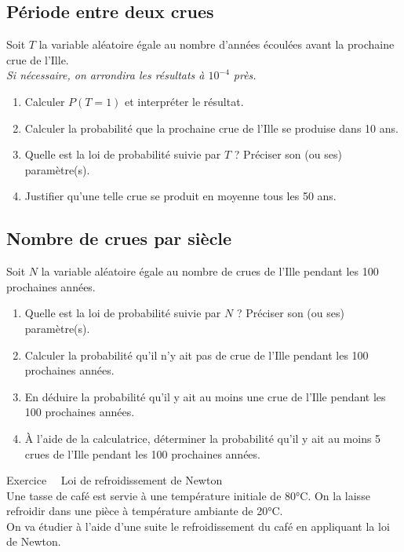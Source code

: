 \documentclass[a4paper,11pt,eval]{nsi}
\newcounter{exoNum}
\newcommand{\exo}[1]
{
	\addtocounter{exoNum}{1}
	{\titlefont\color{UGLiBlue}\Large Exercice\ \theexoNum\ \normalsize{#1}}\smallskip	
}
\begin{document}
\subsection*{Période entre deux crues}
Soit $T$ la variable aléatoire égale au nombre d'années écoulées avant la prochaine crue de l'Ille.\\ 
\textit{Si nécessaire, on arrondira les résultats à $10^{-4}$ près.}
\begin{enumerate}
    \item Calculer $P(T=1)$ et interpréter le résultat.
    \item Calculer la probabilité que la prochaine crue de l'Ille se produise dans 10 ans.
    \item Quelle est la loi de probabilité suivie par $T$ ? Préciser son (ou ses) paramètre(s).
    \item Justifier qu'une telle crue se produit en moyenne tous les 50 ans.
\end{enumerate}

\subsection*{Nombre de crues par siècle}
Soit $N$ la variable aléatoire égale au nombre de crues de l'Ille pendant les 100 prochaines années.
\begin{enumerate}
    \item Quelle est la loi de probabilité suivie par $N$ ? Préciser son (ou ses) paramètre(s).
    \item Calculer la probabilité qu'il n'y ait pas de crue de l'Ille pendant les 100 prochaines années.
    \item En déduire la probabilité qu'il y ait au moins une crue de l'Ille pendant les 100 prochaines années.
    \item À l'aide de la calculatrice, déterminer la probabilité qu'il y ait au moins 5 crues de l'Ille pendant les 100 prochaines années.
\end{enumerate}

\vspace*{.5cm}

\exo{ Loi de refroidissement de Newton}\\
Une tasse de café est servie à une température initiale de 80°C. On la laisse refroidir dans une pièce à température ambiante de 20°C.\\
On va étudier à l'aide d'une suite le refroidissement du café en appliquant la loi de Newton.\\
\end{document}
